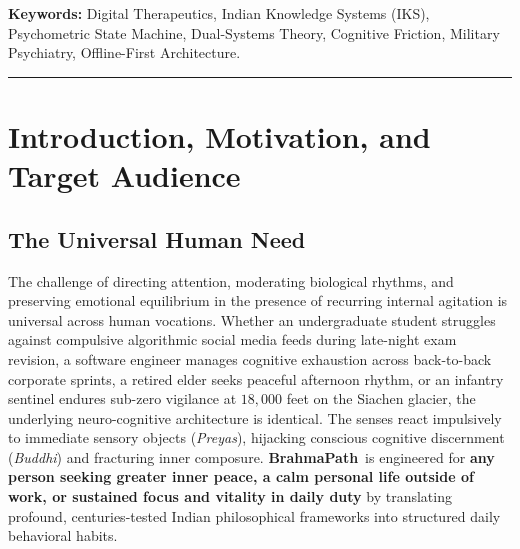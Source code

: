 \documentclass[11pt,a4paper]{article}
\newcommand{\AppName}{\textbf{BrahmaPath}}
\begin{document}
\textbf{Keywords:} Digital Therapeutics, Indian Knowledge Systems (IKS), Psychometric State Machine, Dual-Systems Theory, Cognitive Friction, Military Psychiatry, Offline-First Architecture.

\vspace{1em}
\hrule
\vspace{1em}

\section{Introduction, Motivation, and Target Audience}

\subsection{The Universal Human Need}
The challenge of directing attention, moderating biological rhythms, and preserving emotional equilibrium in the presence of recurring internal agitation is universal across human vocations. Whether an undergraduate student struggles against compulsive algorithmic social media feeds during late-night exam revision, a software engineer manages cognitive exhaustion across back-to-back corporate sprints, a retired elder seeks peaceful afternoon rhythm, or an infantry sentinel endures sub-zero vigilance at $18{,}000$ feet on the Siachen glacier, the underlying neuro-cognitive architecture is identical. The senses react impulsively to immediate sensory objects (\textit{Preyas}), hijacking conscious cognitive discernment (\textit{Buddhi}) and fracturing inner composure. \AppName\ is engineered for \textbf{any person seeking greater inner peace, a calm personal life outside of work, or sustained focus and vitality in daily duty} by translating profound, centuries-tested Indian philosophical frameworks into structured daily behavioral habits.
\end{document}
